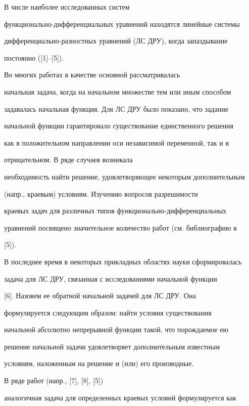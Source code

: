 \label{begin}








В числе наиболее исследованных систем


функционально-дифференциальных уравнений находятся линейные системы


дифференциально-разностных уравнений (ЛС ДРУ), когда запаздывание


постоянно ([1]--[5]).


Во многих работах в качестве основной рассматривалась


начальная задача, когда на начальном множестве тем или иным способом


задавалась начальная функция. Для ЛС ДРУ было показано, что задание


начальной функции гарантировало существование единственного решения


как в положительном направлении оси независимой переменной, так и в


отрицательном. В ряде случаев возникала


необходимость найти решение, удовлетворяющее некоторым дополнительным


(напр., краевым) условиям. Изучению вопросов разрешимости


краевых задач для различных типов функционально-дифференциальных


уравнений посвящено значительное количество работ (см. библиографию в


[5]).





В последнее время в некоторых прикладных областях науки сформировалась


задача для ЛС ДРУ, связанная с исследованиями начальной функции


[6]. Назовем ее обратной начальной задачей для ЛС ДРУ. Она


формулируется следующим образом: найти условия существования 


начальной абсолютно непрерывной функции такой, что порождаемое ею 


решение начальной задачи удовлетворяет дополнительным известным 


условиям, наложенным на решение и (или) его производные.


В ряде работ (напр., [7], [8], [5])


аналогичная задача для определенных краевых условий формулируется как


